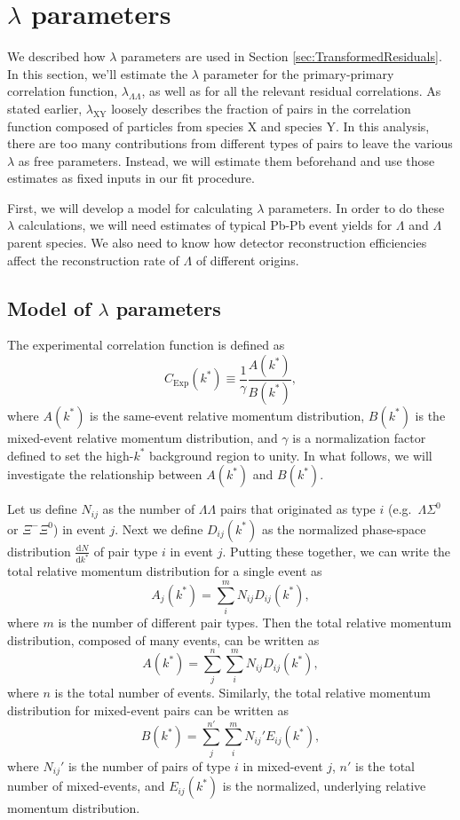 \section{$\lambda$ parameters}
\label{sec:LambdaParams}

We described how $\lambda$ parameters are used in Section \ref{sec:TransformedResiduals}. In this section, we'll estimate the $\lambda$ parameter for the primary-primary correlation function, $\lambda_{\Lambda\Lambda}$, as well as for all the relevant residual correlations.
As stated earlier, $\lambda_\mathrm{XY}$ loosely describes the fraction of pairs in the correlation function composed of particles from species X and species Y.
In this analysis, there are too many contributions from different types of pairs to leave the various $\lambda$ as free parameters.
Instead, we will estimate them beforehand and use those estimates as fixed inputs in our fit procedure.

First, we will develop a model for calculating $\lambda$ parameters. 
In order to do these $\lambda$ calculations, we will need estimates of typical Pb-Pb event yields for $\Lambda$ and $\Lambda$ parent species.
We also need to know how detector reconstruction efficiencies affect the reconstruction rate of $\Lambda$ of different origins.

\subsection{Model of $\lambda$ parameters}
\label{sec:LambdaModel}

The experimental correlation function is defined as 
\begin{equation}
\label{eq:ExpCorrelationFunction}
C_{\mathrm{Exp}}(k^*) \equiv \frac{1}{\gamma} \frac{A(k^*)}{B(k^*)},
\end{equation}
where $A(k^*)$ is the same-event relative momentum distribution, $B(k^*)$ is the mixed-event relative momentum distribution, and $\gamma$ is a normalization factor defined to set the high-$k^*$ background region to unity. 
In what follows, we will investigate the relationship between $A(k^*)$ and $B(k^*)$. 


Let us define $N_{ij}$ as the number of $\Lambda\Lambda$ pairs that originated as type $i$ (e.g.\ $\Lambda\Sigma^0$ or $\Xi^-\Xi^0$) in event $j$.
Next we define $D_{ij}(k^*)$ as the normalized phase-space distribution $\frac{\mathrm{d}N}{\mathrm{d}k^*}$ of pair type $i$ in event $j$. 
Putting these together, we can write the total relative momentum distribution for a single event as
$$A_j(k^*) = \sum_i^m N_{ij} D_{ij}(k^*),$$
where $m$ is the number of different pair types.
Then the total relative momentum distribution, composed of many events, can be written as
$$A(k^*) = \sum_j^n \sum_i^m N_{ij} D_{ij}(k^*),$$
where $n$ is the total number of events.
Similarly, the total relative momentum distribution for mixed-event pairs can be written as
$$B(k^*) = \sum_j^{n'} \sum_i^m N_{ij}' E_{ij}(k^*),$$
where $N_{ij}'$ is the number of pairs of type $i$ in mixed-event $j$, $n'$ is the total number of mixed-events, and $E_{ij}(k^*)$ is the normalized, underlying relative momentum distribution.

